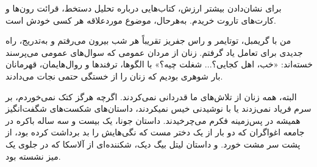 برای نشان‌دادن بیشتر ارزش، کتاب‌هایی درباره تحلیل دستخط، قرائت رون‌ها و کارت‌های تاروت خریدم. به‌هرحال، موضوع موردعلاقه هر کسی خودش است.

من با گریمبل، توتایمر و راس جفریز تقریباً هر شب بیرون می‌رفتم و به‌تدریج، راه جدیدی برای تعامل یاد گرفتم. زنان از مردان عمومی که سوال‌های عمومی می‌پرسند خسته‌اند: «خب، اهل کجایی؟... شغلت چیه؟» با الگوها، ترفندها و روال‌هایمان، قهرمانان بار شوهری بودیم که زنان را از خستگی حتمی نجات می‌دادند.

البته، همه زنان از تلاش‌های ما قدردانی نمی‌کردند. اگرچه هرگز کتک نمی‌خوردم، بر سرم فریاد نمی‌زدند یا با نوشیدنی خیس نمیکردند، داستان‌های شکست‌های شگفت‌انگیز همیشه در پس‌زمینه فکرم می‌چرخیدند. داستان جونا، یک بیست و سه ساله باکره در جامعه اغواگران که دو بار از یک دختر مست که نگی‌هایش را بد برداشت کرده بود، از پشت سر مشت خورد. و داستان لیتل بیگ دیک، شکننده‌ای از آلاسکا که در جلوی یک میز نشسته بود.
